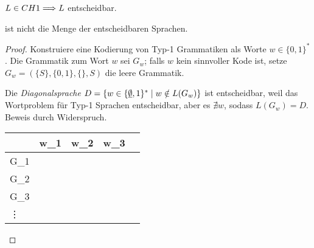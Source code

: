 \begin{Satz}
$L\in\ch{1} \==> L$ entscheidbar.
\end{Satz}

\begin{Satz}
  ist nicht die Menge der entscheidbaren Sprachen.
\end{Satz}
\begin{proof}
 	\begin{minipage}[t]{.7\linewidth}
	Konstruiere eine Kodierung von Typ-1 Grammatiken als Worte
        $w\in\{0,1\}^*$. Die Grammatik zum Wort $w$ sei $G_w$; falls
        $w$ kein sinnvoller Kode ist, setze $G_w = (\{S\}, \{0,1\},
        \{\}, S)$ die leere Grammatik.
        
	Die \emph{Diagonalsprache} $D = \{w \in\{\underline{\smash{\emptyset}},1\}^* \mid w\notin
        L(G_w)\}$ ist entscheidbar, weil das Wortproblem für Typ-1  
	Sprachen entscheidbar, aber es $\nexists w$, sodass $L(G_w) =
        D$. Beweis durch Widerspruch.
	\end{minipage}\quad
	\begin{tabular}[t]{M{c} | *4{M{c}@{ }}}
		\ &w_1&w_2&w_3&\cdots\\\hline
		G_1 &\\
		G_2 &\\
		G_3 &\\
		\vdots&
	\end{tabular}
\end{proof}






